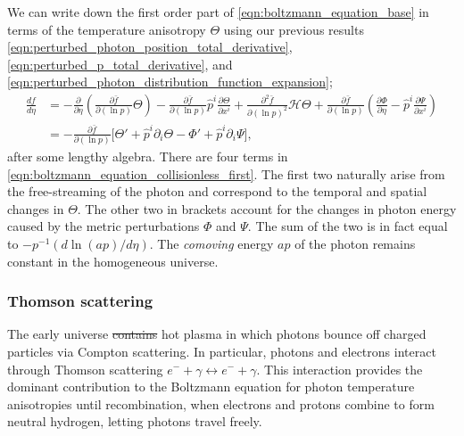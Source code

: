\documentclass[a4paper,12pt,times,custombib,print,index]{Classes/PhDThesisPSnPDF} %
\providecommand{\DIFadd}[1]{{\protect\color{blue}\uwave{#1}}} %
\providecommand{\DIFdel}[1]{{\protect\color{red}\sout{#1}}}                      %
\providecommand{\DIFaddbegin}{} %
\providecommand{\DIFaddend}{} %
\providecommand{\DIFdelbegin}{} %
\providecommand{\DIFdelend}{} %
\newcommand{\DIFscaledelfig}{0.5}
\newlength{\DIFdelgraphicswidth} %
\newlength{\DIFdelgraphicsheight} %
\newcommand{\DIFaddincludegraphics}[2][]{{\color{blue}\fbox{\DIFOincludegraphics[#1]{#2}}}} %
\newcommand{\DIFdelincludegraphics}[2][]{%
\sbox{\DIFdelgraphicsbox}{\DIFOincludegraphics[#1]{#2}}%
\settoboxwidth{\DIFdelgraphicswidth}{\DIFdelgraphicsbox} %
\settoboxtotalheight{\DIFdelgraphicsheight}{\DIFdelgraphicsbox} %
\scalebox{\DIFscaledelfig}{%
\parbox[b]{\DIFdelgraphicswidth}{\usebox{\DIFdelgraphicsbox}\\[-\baselineskip] \rule{\DIFdelgraphicswidth}{0em}}\llap{\resizebox{\DIFdelgraphicswidth}{\DIFdelgraphicsheight}{%
\setlength{\unitlength}{\DIFdelgraphicswidth}%
\begin{picture}(1,1)%
\thicklines\linethickness{2pt} %
{\color[rgb]{1,0,0}\put(0,0){\framebox(1,1){}}}%
{\color[rgb]{1,0,0}\put(0,0){\line( 1,1){1}}}%
{\color[rgb]{1,0,0}\put(0,1){\line(1,-1){1}}}%
\end{picture}%
}\hspace*{3pt}}} %
} %
\DeclareRobustCommand{\DIFaddbegin}{\DIFOaddbegin \let\includegraphics\DIFaddincludegraphics} %
\DeclareRobustCommand{\DIFaddend}{\DIFOaddend \let\includegraphics\DIFOincludegraphics} %
\DeclareRobustCommand{\DIFdelbegin}{\DIFOdelbegin \let\includegraphics\DIFdelincludegraphics} %
\DeclareRobustCommand{\DIFdelend}{\DIFOaddend \let\includegraphics\DIFOincludegraphics} %
\begin{document}
We can write down the first order part of \eqref{eqn:boltzmann_equation_base} in terms of the temperature anisotropy $\Theta$ using our previous results \eqref{eqn:perturbed_photon_position_total_derivative}, \eqref{eqn:perturbed_p_total_derivative}, and \eqref{eqn:perturbed_photon_distribution_function_expansion};
\begin{align}
	\frac{df}{d\eta} &= - \frac{\partial}{\partial\eta} \left( \frac{\partial \bar{f}}{\partial(\ln p)} \Theta \right) - \frac{\partial \bar{f}}{\partial (\ln p)} \hat{p}^i \frac{\partial \Theta}{\partial x^i} +  \frac{\partial^2 \bar{f}}{\partial(\ln p)^2} \mathcal{H}\Theta + \frac{\partial \bar{f}}{\partial (\ln p)} \left( \frac{\partial \Phi}{\partial \eta} - \hat{p}^i \frac{\partial \Psi}{\partial x^i} \right) \\
	&= - \frac{\partial \bar{f}}{\partial (\ln p)} \biggl[ \Theta' + \hat{p}^i \partial_i \Theta - \Phi' + \hat{p}^i \partial_i \Psi \biggr], \label{eqn:boltzmann_equation_collisionless_first}
\end{align}
after some lengthy algebra. There are four terms in \eqref{eqn:boltzmann_equation_collisionless_first}. The first two naturally arise from the free-streaming of the photon and correspond to the temporal and spatial changes in $\Theta$. The other two in brackets account for the changes in photon energy caused by the metric perturbations $\Phi$ and $\Psi$. The sum of the two is in fact equal to $-p^{-1}(d \ln(ap)/d\eta)$. The \textit{comoving} energy $ap$ of the photon remains constant in the homogeneous universe.


\subsubsection*{Thomson scattering} \label{section:thompson_scattering}

The early universe \DIFdelbegin \DIFdel{contains }\DIFdelend \DIFaddbegin \DIFadd{contained }\DIFaddend hot plasma in which photons bounce off charged particles via Compton scattering. In particular, photons and electrons interact through Thomson scattering $e^- + \gamma \leftrightarrow e^- + \gamma$. This interaction provides the dominant contribution to the Boltzmann equation for photon temperature anisotropies until recombination, when electrons and protons combine to form neutral hydrogen, letting photons travel freely.
\end{document}
